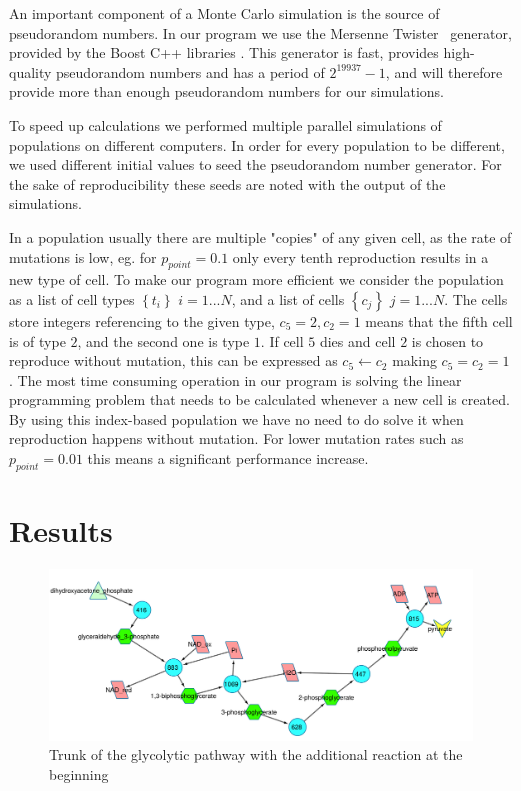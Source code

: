 \documentclass[a4paper,12pt]{article}
\begin{document}
	An important component of a Monte Carlo simulation is the source of pseudorandom numbers. In our program we use the Mersenne Twister \cite{mersennetwister}~generator, provided by the Boost C++ libraries \cite{boostlibraries}. This generator is fast, provides high-quality pseudorandom numbers and has a period of $2^{19937}-1$, and will therefore provide more than enough pseudorandom numbers for our simulations.

	To speed up calculations we performed multiple parallel simulations of populations on different computers. In order for every population to be different, we used different initial values to seed the pseudorandom number generator. For the sake of reproducibility these seeds are noted with the output of the simulations. 

In a population usually there are multiple "copies" of any given cell, as the rate of mutations is low, eg. for $p_{point}=0.1$ only every tenth reproduction results in a new type of cell. To make our program more efficient we consider the population as a list of cell types $ \left\{ t_i \right\}$ $i=1...N$, and a list of cells $\left\{ c_j \right\}$ $j=1...N$. The cells store integers referencing to the given type, $c_5=2, c_2=1$ means that the fifth cell is of type $2$, and the second one is type $1$. If cell $5$ dies and cell $2$ is chosen to reproduce without mutation, this can be expressed as $c_5 \leftarrow c_2$ making $c_5=c_2=1$. The most time consuming operation in our program is solving the linear programming problem that needs to be calculated whenever a new cell is created. By using this index-based population we have no need to do solve it when reproduction happens without mutation. For lower mutation rates such as $p_{point}=0.01$ this means a significant performance increase. 

\section{Results}
\label{sec:results}

\begin{figure}[htpb]
	\centering
	\includegraphics[width=1\linewidth]{trunk_glyc_init_large.pdf}
	\caption{Trunk of the glycolytic pathway with the additional reaction at the beginning}
	\label{fig:truncglycinit}
\end{figure}
\end{document}
